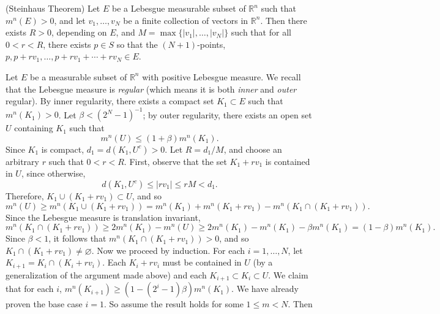 \documentclass{article}
\begin{document}
	\begin{prb}{(Steinhaus Theorem)}
		Let $E$ be a Lebesgue measurable subset of $\mathbb{R}^{n}$ such that $m^{n}(E) > 0$, and let $v_{1}, \ldots, v_{N}$ be a finite collection of vectors in $\mathbb{R}^{n}$. Then there exists $R > 0$, depending on $E$, and $M = \max\{|v_{1}|, \ldots, |v_{N}|\}$ such that for all $0 < r < R$, there exists $p \in S$ so that the $(N + 1)$-points, $p, p + rv_{1}, \ldots, p + rv_{1} + \dotsm + rv_{N}\in E$. 
	\end{prb}
		Let $E$ be a measurable subset of $\mathbb{R}^{n}$ with positive Lebesgue measure. We recall that the Lebesgue measure is \textit{regular} (which means it is both \textit{inner} and \textit{outer} regular). By inner regularity, there exists a compact set $K_{1} \subset E$ such that $m^{n}(K_{1}) > 0$. Let $\beta < (2^{N} - 1)^{-1}$; by outer regularity, there exists an open set $U$ containing $K_{1}$ such that 
		\begin{equation*}
			m^{n}(U) \leq (1 + \beta)m^{n}(K_{1}). 
		\end{equation*}
		Since $K_{1}$ is compact, $d_{1} = d(K_{1}, U^{c}) > 0$. Let $R = d_{1}/M$, and choose an arbitrary $r$ such that $0 < r < R$. First, observe that the set $K_{1} + rv_{1}$ is contained in $U$, since otherwise, 
		\begin{equation*}
			d(K_{1}, U^{c}) \leq |rv_{1}| \leq rM < d_{1}. 
		\end{equation*}
		Therefore, $K_{1} \cup (K_{1} + rv_{1}) \subset U$, and so 
		\begin{equation*}
			m^{n}(U) \geq m^{n}(K_{1}\cup (K_{1} + rv_{1})) = m^{n}(K_{1}) + m^{n}(K_{1} + rv_{1}) - m^{n}(K_{1} \cap (K_{1} + rv_{1})). 
		\end{equation*}
		Since the Lebesgue measure is translation invariant, 
		\begin{equation*}
			m^{n}(K_{1} \cap (K_{1} + rv_{1})) \geq 2m^{n}(K_{1}) - m^{n}(U) \geq 2m^{n}(K_{1}) - m^{n}(K_{1}) - \beta m^{n}(K_{1}) = (1 - \beta)m^{n}(K_{1}). 
		\end{equation*}
		Since $\beta < 1$, it follows that $m^{n}(K_{1} \cap (K_{1} + rv_{1})) > 0$, and so $K_{1} \cap (K_{1} + rv_{1}) \neq \varnothing$. Now we proceed by induction. For each $i = 1, \ldots, N$, let $K_{i + 1} = K_{i} \cap (K_{i} + rv_{i})$. Each $K_{i} + rv_{i}$ must be contained in $U$ (by a generalization of the argument made above) and each $K_{i + 1} \subset K_{i} \subset U$. We claim that for each $i$, $m^{n}(K_{i + 1}) \geq (1- (2^{i} - 1)\beta)m^{n}(K_{1})$. We have already proven the base case $i = 1$. So assume the result holds for some $1 \leq m < N$. Then 
\end{document}
